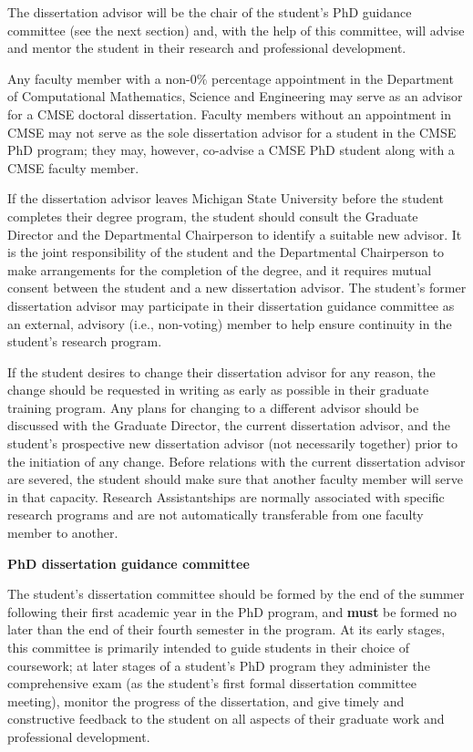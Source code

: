 The dissertation advisor will be the chair of the student's PhD
guidance committee (see the next section) and, with the help of this
committee, will advise and mentor the student in their research and
professional development.  

Any faculty member with a non-0\% percentage appointment in the
Department of Computational Mathematics, Science and Engineering may
serve as an advisor for a CMSE doctoral dissertation.  Faculty members
without an appointment in CMSE may not serve as the sole dissertation
advisor for a student in the CMSE PhD program; they may, however,
co-advise a CMSE PhD student along with a CMSE faculty member.

If the dissertation advisor leaves Michigan State University before the
student completes their degree program, the student should consult
the Graduate Director and the Departmental Chairperson to identify a
suitable new advisor.  It is the joint responsibility of the
student and the Departmental Chairperson to make arrangements for the
completion of the degree, and it requires mutual consent between the
student and a new dissertation advisor.  The student's former
dissertation advisor may participate in their dissertation guidance
committee as an external, advisory (i.e., non-voting) member to help
ensure continuity in the student's research program.

If the student desires to change their dissertation advisor for any
reason, the change should be requested in writing as early as possible in their
graduate training program.  Any plans for changing to a different
advisor should be discussed with the Graduate Director, 
 the current dissertation advisor, and the student's
prospective new dissertation advisor (not necessarily together) prior
to the initiation of any change.  Before relations with the current
dissertation advisor are severed, the student should make sure that
another faculty member will serve in that capacity.  Research
Assistantships are normally associated with specific research programs
and are not automatically transferable from one faculty member to
another.

\vspace{3mm}
\noindent
\textbf{PhD dissertation guidance committee}

The student's dissertation committee should be formed by the end of the
summer following their first academic year in the PhD program, and
\textbf{must} be formed no later than the end of their fourth semester
in the program. At its early stages, this committee is primarily
intended to guide students in their choice of coursework; at later
stages of a student's PhD program they administer the comprehensive
exam (as the student's first formal dissertation committee meeting), 
monitor the progress of the dissertation, and give timely and
constructive feedback to the student on all aspects of their graduate
work and professional development.

